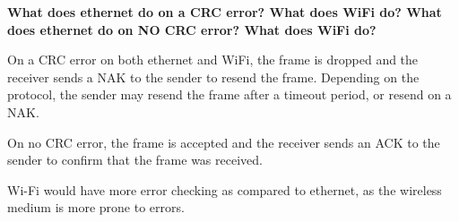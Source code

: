 \documentclass{article}
\begin{document}
\textbf{What does ethernet do on a CRC error? What does WiFi do?
What does ethernet do on NO CRC error? What does WiFi do?
}

On a CRC error on both ethernet and WiFi, the frame is dropped and the receiver sends a NAK to the sender to resend the frame. Depending on the protocol, the sender may resend the frame after a timeout period, or resend on a NAK.

On no CRC error, the frame is accepted and the receiver sends an ACK to the sender to confirm that the frame was received. 

Wi-Fi would have more error checking as compared to ethernet, as the wireless medium is more prone to errors.   
\end{document}
